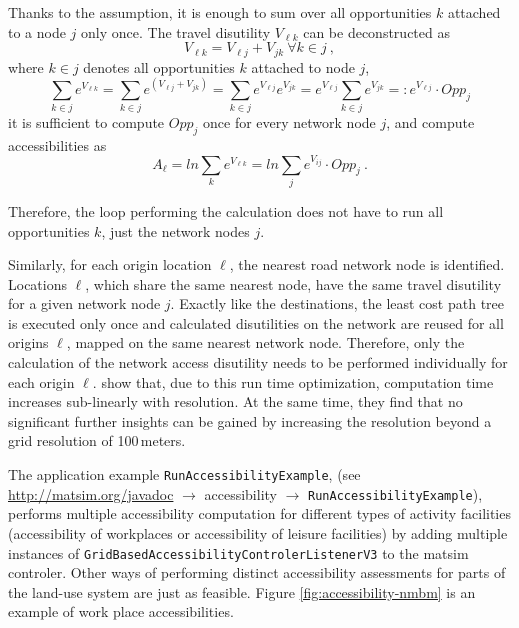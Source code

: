 Thanks to the assumption, it is enough to sum over all opportunities $k$ attached to a node $j$ only 
once. The travel disutility $V_{\ell k}$ can be deconstructed as
\begin{equation}
V_{\ell k} = V_{\ell j} + V_{jk} \ \forall k \in j \ ,
\end{equation}
where $k \in j$ denotes all opportunities $k$ attached to node $j$,
\begin{equation}
\sum_{k \in j} e^{ V_{\ell k}} 
%
= \sum_{k \in j} e^{ (V_{\ell j}+ V_{jk})} 
%
= \sum_{k \in j} e^{ V_{\ell j}} e^{ V_{jk}} 
%
= e^{ V_{\ell j}} \sum_{k \in j} e^{ V_{jk}} 
%
=: e^{ V_{\ell j}} \cdot Opp_j
\end{equation} 
it is sufficient to compute $Opp_j$ once for every network node $j$, and compute accessibilities as
\begin{equation}
A_\ell = ln \sum_k e^{ V_{\ell k}}
%
= ln \sum_j e^{ V_{ij}} \cdot Opp_j \ .
\end{equation}

Therefore, the loop performing the calculation does not have to run all opportunities $k$, 
just the network nodes $j$.

Similarly, for each origin location $\ell$, the nearest road network node is identified.
Locations $\ell$, which share the same nearest node, have the same travel disutility for a given network
node $j$. Exactly like the destinations, the least cost path tree is executed
only once and calculated disutilities on the network are reused for all origins $\ell$, 
mapped on the same nearest network node. Therefore, only the calculation of the network access disutility 
needs to be performed individually for each origin $\ell$.
\citet{NicolaiNagelHiResAccessibilityMethod} show that, due to this run time optimization, computation
time increases sub-linearly with resolution. At the same time, they find that no significant further
insights can be gained by increasing the resolution beyond a grid resolution of 100\,meters.

The application example \lstinline{RunAccessibilityExample}, (see \url{http://matsim.org/javadoc} $\to$ 
accessibility $\to$ \lstinline{RunAccessibilityExample}), performs multiple accessibility computation for
different types of activity facilities (\eg accessibility of workplaces or accessibility of leisure
facilities) by adding multiple instances of \lstinline{GridBasedAccessibilityControlerListenerV3}
to the \gls{matsim} controler. Other ways of performing distinct accessibility assessments for parts of
the land-use system are just as feasible. Figure \ref{fig:accessibility-nmbm} is an example of
 work place accessibilities.

